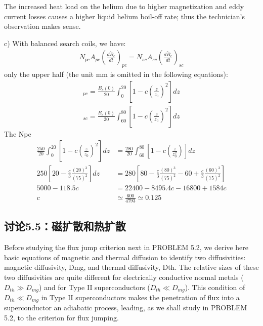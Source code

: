 The increased heat load on the helium due to higher magnetization and eddy
current losses causes a higher liquid helium boil-off rate; thus the technician’s
observation makes sense.

c) With balanced search coils, we have:
\begin{align*}%
N_{pc}A_{pc}(\frac{d\tilde{B}_{e}}{dt})_{pc}=N_{sc}A_{sc}(\frac{d\tilde{B}_{e}}{dt})_{sc}\tag{S1.2}
\end{align*}
only the upper half (the unit mm is omitted in the following equations):
\begin{align*}%
[\tilde{B}_{e}]_{pc}=\frac{B_{e}(0)}{20}\int_{0}^{20}[1-c(\frac{z}{z_{0}})^{2}]dz\tag{S1.3a}
\end{align*}
\begin{align*}%
[\tilde{B}_{e}]_{sc}=\frac{B_{e}(0)}{20}\int_{60}^{80}[1-c(\frac{z}{z_{0}})^{2}]dz\tag{S1.3b}
\end{align*}
The Npc%
\begin{align*}%
\frac{250}{20}\int_{0}^{20}[1-c(\frac{z}{z_{0}})^{2}]dz&=\frac{280}{20}\int_{60}^{80}[1-c(\frac{z}{z_{0}^{2}})]dz\\\tag{S1.4}
250[20-\frac{c}{3}\frac{(20)^{3}}{(75)^{2}}]dz&=280[80-\frac{c}{3}\frac{(80)^{3}}{(75)^{2}}-60+\frac{c}{3}\frac{(60)^{3}}{(75)^{2}}]\\
5000-118.5c&=22400-8495.4c-16800+1584c\\
c&\simeq\frac{600}{4793}\simeq 0.125
\end{align*}


\subsection{讨论5.5：磁扩散和热扩散}
Before studying the flux jump criterion next in PROBLEM 5.2, we derive here basic
equations of magnetic and thermal diffusion to identify two diffusivities: magnetic
diffusivity, Dmg, and thermal diffusivity, Dth. The relative sizes of these two
diffusivities are quite different for electrically conductive normal metals ($D_{th}\gg D_{mg}$) and for Type II superconductors ($D_{th}\ll D_{mg}$). This condition of $D_{th}\ll D_{mg}$
in Type II superconductors makes the penetration of flux into a superconductor
an adiabatic process, leading, as we shall study in PROBLEM 5.2, to the criterion
for flux jumping.

